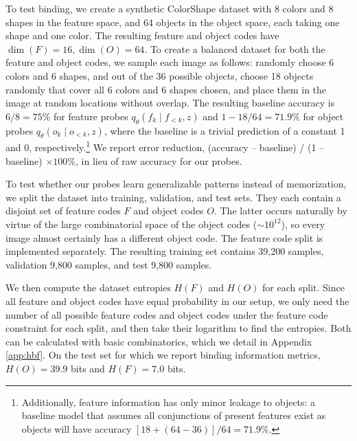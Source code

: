 \documentclass{article}
\theoremstyle{plain}
\theoremstyle{definition}
\theoremstyle{remark}
\begin{document}
To test binding, we create a synthetic ColorShape dataset with 8 colors and 8 shapes in the feature space, and 64 objects in the object space, each taking one shape and one color. The resulting feature and object codes have $\dim(F)=16, \dim(O)=64$. To create a balanced dataset for both the feature and object codes, we sample each image as follows: randomly choose 6 colors and 6 shapes, and out of the 36 possible objects, choose 18 objects randomly that cover all 6 colors and 6 shapes chosen, and place them in the image at random locations without overlap. The resulting baseline accuracy is $6/8=75\%$ for feature probes $q_\theta (f_k\mid f_{<k}, z)$ and $1-18/64=71.9\%$ for object probes $q_\theta (o_k\mid o_{<k}, z)$, where the baseline is a trivial prediction of a constant 1 and 0, respectively.\footnote{Additionally, feature information has only minor leakage to objects: a baseline model that assumes all conjunctions of present features exist as objects will have accuracy $[18+(64-36)]/64=71.9\%$.} We report error reduction, (accuracy -- baseline) / (1 -- baseline) $\times 100\%$, in lieu of raw accuracy for our probes.

To test whether our probes learn generalizable patterns instead of memorization, we split the dataset into training, validation, and test sets. They each contain a disjoint set of feature codes $F$ and object codes $O$. The latter occurs naturally by virtue of the large combinatorial space of the object codes ($\sim10^{12}$), so every image almost certainly has a different object code. The feature code split is implemented separately. The resulting training set contains 39,200 samples, validation 9,800 samples, and test 9,800 samples. 

We then compute the dataset entropies $H(F)$ and $H(O)$ for each split. Since all feature and object codes have equal probability in our setup, we only need the number of all possible feature codes and object codes under the feature code constraint for each split, and then take their logarithm to find the entropies. Both can be calculated with basic combinatorics, which we detail in Appendix \ref{app:hbf}. On the test set for which we report binding information metrics, $H(O)=39.9$ bits and $H(F)=7.0$ bits.
\end{document}
